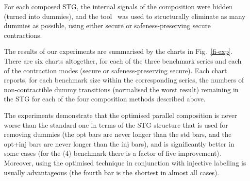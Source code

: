 For each composed STG, the internal signals of the composition
were hidden (\ie turned into dummies), and the \desij
tool~\cite{Sch07} was used to structurally eliminate as many
dummies as possible, using either secure or safeness-preserving
secure contractions.

The results of our experiments are summarised by the charts in
Fig.~\ref{fi-exp}. There are six charts altogether, for each of
the three benchmark series and each of the contraction modes
(secure or safeness-preserving secure). Each chart reports, for
each benchmark size within the corresponding series, the
numbers of non-con\-trac\-tible dummy transitions (normalised
\wrt the worst result) remaining in the STG for each of the
four composition methods described above.

The experiments demonstrate that the optimised parallel
composition is never worse than the standard one in terms of
the STG structure that is used for removing dummies (the opt
bars are never longer than the std bars, and the opt+inj bars
are never longer than the inj bars), and is significantly
better in some cases (\eg for the \SeqCallParSync(4) benchmark
there is a factor of five improvement). Moreover, using the
optimised technique in conjunction with injective labelling is
usually advantageous (the fourth bar is the shortest in almost
all cases).
